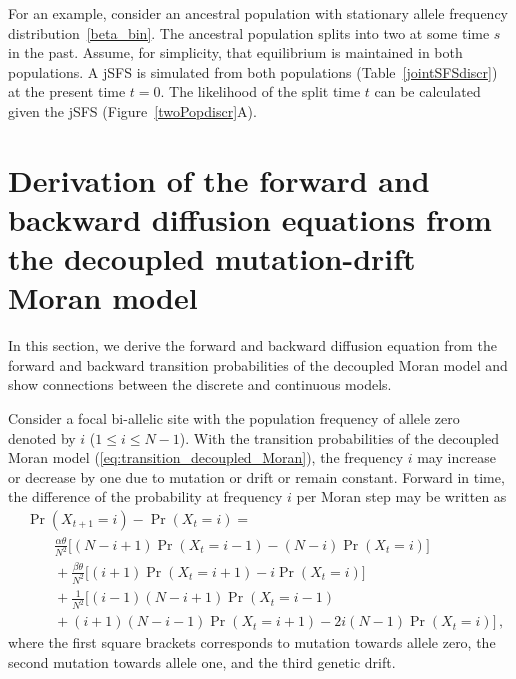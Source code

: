\documentclass[preprint]{elsarticle}
\newcommand\x[1]{\ensuremath{X_{#1}}}
\begin{document}
For an example, consider an ancestral population with stationary allele frequency distribution~\eqref{beta_bin}. The ancestral population splits into two at some time $s$ in the past. Assume, for simplicity, that equilibrium is maintained in both populations. A jSFS is simulated from both populations (Table~\ref{jointSFSdiscr}) at the present time $t=0$. The likelihood of the split time $t$ can be calculated given the jSFS (Figure~\ref{twoPopdiscr}A).


\section{Derivation of the forward and backward diffusion equations from the decoupled mutation-drift Moran model}

In this section, we derive the forward and backward diffusion equation from the forward and backward transition probabilities of the decoupled Moran model and show connections between the discrete and continuous models.

Consider a focal bi-allelic site with the population frequency of allele zero denoted by $i$ ($1 \leq i \leq N-1$). With the transition probabilities of the decoupled Moran model (\ref{eq:transition_decoupled_Moran}), the frequency $i$ may increase or decrease by one due to mutation or drift or remain constant. Forward in time, the difference of the probability at frequency $i$ per Moran step may be written as
\begin{equation}\label{eq:forw_discr_mutation}
\begin{split}
&\Pr(\x{t+1}=i)-\Pr(\x{t}=i) = \\
&\qquad \frac{\alpha\theta}{N^2} \bigg[(N-i+1)\Pr(\x{t}=i-1) - (N-i)\Pr(\x{t}=i)\bigg]\\
&\qquad+\frac{\beta\theta}{N^2} \bigg[(i+1)\Pr(\x{t}=i+1) - i\Pr(\x{t}=i)\bigg]\\
&\qquad+\frac1{N^2}\bigg[(i-1)(N-i+1)\Pr(\x{t}=i-1) \\
&\qquad+ (i+1)(N-i-1)\Pr(\x{t}=i+1)-2i(N-1)\Pr(\x{t}=i)\bigg]\,,
\end{split}
\end{equation}
where the first square brackets corresponds to mutation towards allele zero, the second mutation towards allele one, and the third genetic drift.
\end{document}
